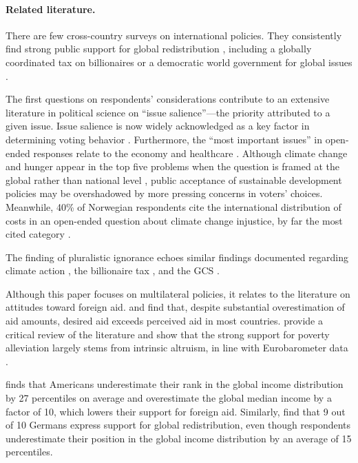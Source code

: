 \documentclass[12pt,english]{article}
\begin{document}
\begin{bibunit}
\paragraph{Related literature.}
There are few cross-country surveys on international policies. They consistently find strong public support for global redistribution \citep{fabre_majority_2025}, including a globally coordinated tax on billionaires \citep{cappelen_majority_2025} or a democratic world government for global issues \citep{ghassim_who_2024}.

The first questions on respondents' considerations contribute to an extensive literature in political science on ``issue salience''---the priority attributed to a given issue. Issue salience is now widely acknowledged as a key factor in determining voting behavior \citep{repass_issue_1971,egan_partisan_2013,krosnick_role_1988,dennison_review_2019,edwards_explaining_1995}. Furthermore, the ``most important issues'' in open-ended responses relate to the economy and healthcare \citep{wlezien_salience_2005}. Although climate change and hunger appear in the top five problems when the question is framed at the global rather than national level \citep{yeager_measuring_2011}, public acceptance of sustainable development policies may be overshadowed by more pressing concerns in voters' choices. Meanwhile, 40\% of Norwegian respondents cite the international distribution of costs in an open-ended question about climate change injustice, by far the most cited category \citep{gregersen_poor_2025}.

The finding of pluralistic ignorance echoes similar findings documented regarding climate action \citep{andre_misperceived_2024,andre_globally_2024,mildenberger_beliefs_2019}, the billionaire tax \citep{cappelen_majority_2025}, and the GCS \citep{fabre_majority_2025}.

Although this paper focuses on multilateral policies, it relates to the literature on attitudes toward foreign aid. \cite{kaufmann_foreign_2019} and \cite{fabre_majority_2025} find that, despite substantial overestimation of aid amounts, desired aid exceeds perceived aid in most countries. \cite{hudson_mile_2012} provide a critical review of the literature and show that the strong support for poverty alleviation largely stems from intrinsic altruism, in line with Eurobarometer data \citep{cho_ideology_2024}. 

\cite{nair_misperceptions_2018} finds that Americans underestimate their rank in the global income distribution by 27 percentiles on average and overestimate the global median income by a factor of 10, which lowers their support for foreign aid. Similarly, \cite{fehr_your_2022} find that 9 out of 10 Germans express support for global redistribution, even though respondents underestimate their position in the global income distribution by an average of 15 percentiles.


\end{bibunit}
\end{document}
